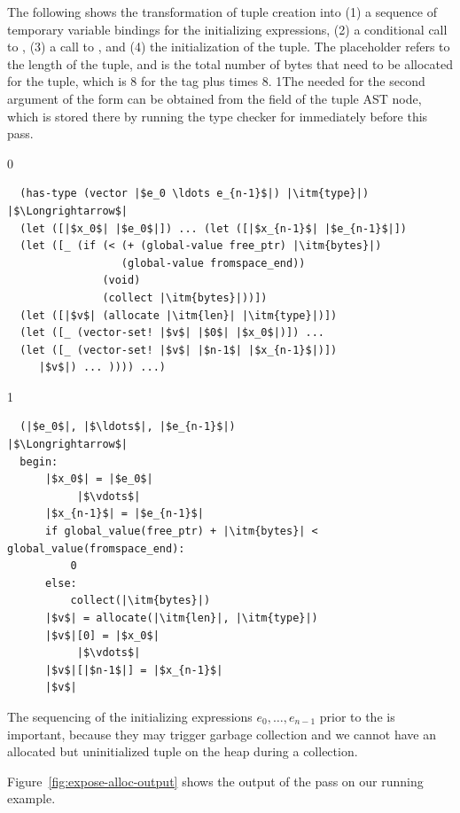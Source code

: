 \documentclass[7x10]{TimesAPriori_MIT}%
\def\racketEd{0}
\def\pythonEd{1}
\def\edition{0}
\newcommand{\python}[1]{{\if\edition\pythonEd #1\fi}}
\numberwithin{theorem}{chapter}
\numberwithin{definition}{chapter}
\numberwithin{equation}{chapter}
\begin{document}
The following shows the transformation of tuple creation into (1) a
sequence of temporary variable bindings for the initializing
expressions, (2) a conditional call to , (3) a call to
, and (4) the initialization of the tuple. The
 placeholder refers to the length of the tuple, and
 is the total number of bytes that need to be allocated for
the tuple, which is 8 for the tag plus  times 8.
%
\python{The  needed for the second argument of the
  \code{allocate} form can be obtained from the \code{has\_type} field
  of the tuple AST node, which is stored there by running the type
  checker for \LangVec{} immediately before this pass.}
%
\begin{center}
\begin{minipage}{\textwidth}
{\if\edition\racketEd
\begin{lstlisting}
  (has-type (vector |$e_0 \ldots e_{n-1}$|) |\itm{type}|)
|$\Longrightarrow$|
  (let ([|$x_0$| |$e_0$|]) ... (let ([|$x_{n-1}$| |$e_{n-1}$|])
  (let ([_ (if (< (+ (global-value free_ptr) |\itm{bytes}|)
                  (global-value fromspace_end))
               (void)
               (collect |\itm{bytes}|))])
  (let ([|$v$| (allocate |\itm{len}| |\itm{type}|)])
  (let ([_ (vector-set! |$v$| |$0$| |$x_0$|)]) ...
  (let ([_ (vector-set! |$v$| |$n-1$| |$x_{n-1}$|)])
     |$v$|) ... )))) ...)
\end{lstlisting}
\fi}
{\if\edition\pythonEd
\begin{lstlisting}
  (|$e_0$|, |$\ldots$|, |$e_{n-1}$|)
|$\Longrightarrow$|
  begin:
      |$x_0$| = |$e_0$|
           |$\vdots$|
      |$x_{n-1}$| = |$e_{n-1}$|
      if global_value(free_ptr) + |\itm{bytes}| < global_value(fromspace_end):
          0
      else:
          collect(|\itm{bytes}|)
      |$v$| = allocate(|\itm{len}|, |\itm{type}|)
      |$v$|[0] = |$x_0$|
           |$\vdots$|
      |$v$|[|$n-1$|] = |$x_{n-1}$|
      |$v$|
\end{lstlisting}
\fi}
\end{minipage}
\end{center}
%
\noindent The sequencing of the initializing expressions
$e_0,\ldots,e_{n-1}$ prior to the  is important, because
they may trigger garbage collection and we cannot have an allocated
but uninitialized tuple on the heap during a collection.

Figure~\ref{fig:expose-alloc-output} shows the output of the
 pass on our running example.
\end{document}
